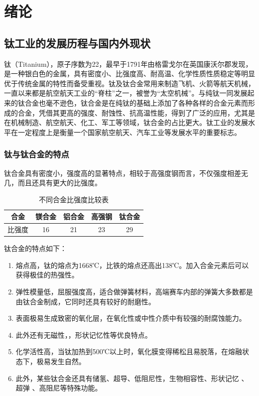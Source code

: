 \chapter{绪论}
\section{钛工业的发展历程与国内外现状}

钛（Titanium），原子序数为22，最早于1791年由格雷戈尔在英国康沃尔郡发现，是一种银白色的金属，具有密度小、比强度高、耐高温、化学性质性质稳定等明显优于传统金属的特性而备受重视。钛及钛合金常用来制造飞机、火箭等航天机械，一直以来都是航空航天工业的“脊柱”之一，被誉为“太空机械”\cite{XJYS200102014}。与纯钛一同发展起来的钛合金也毫不逊色，钛合金是在纯钛的基础上添加了各种各样的合金元素而形成的合金，凭借其更高的强度、耐蚀性、抗高温性能，得到了广泛的应用，尤其是在机械制造、航空航天、化工、军工等领域，钛合金的占比更大。钛工业的发展水平在一定程度上是衡量一个国家航空航天、汽车工业等发展水平的重要标志\cite{HSJJ202109005}。

\subsection{钛与钛合金的特点}
钛合金具有密度小，强度高的显著特点，相较于高强度钢而言，不仅强度相差无几，而且还具有更大的比强度。

\begin{table}[htbp]
	\centering
	\label{sec:bqd}
	\caption{不同合金比强度比较表}
	\begin{tabular}{ccccc}
		\toprule
		\textbf{合金} & \textbf{镁合金} & \textbf{铝合金} & \textbf{高强钢} & \textbf{钛合金} \\
		\midrule
		比强度 & 16 & 21 & 23 & 29 \\
		\bottomrule
	\end{tabular}
\end{table}

钛合金的特点如下\cite{1997titanium}：
\begin{enumerate}
	\item 熔点高，钛的熔点为1668℃，比铁的熔点还高出138℃。加入合金元素后可以获得极佳的热强性。
	\item 弹性模量低，屈服强度高，适合做弹簧材料，高端赛车内部的弹簧大多数都是由钛合金制成，它同时还具有较好的耐磨性。
	\item 表面极易生成致密的氧化层，在氧化性或中性介质中有较强的耐腐蚀能力。
	\item 此外还有无磁性，，形状记忆性等优良特点。
	\item 化学活性高，当钛加热到500℃以上时，氧化膜变得稀松且易脱落，在熔融状态下，极易发生自然。
	\item 此外，某些钛合金还具有储氢、超导、低阻尼性，生物相容性、形状记忆 、 超弹 、高阻尼等特殊功能。
\end{enumerate}

